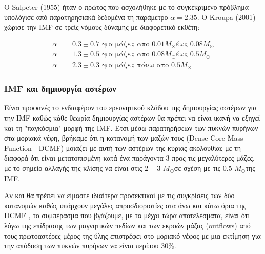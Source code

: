 \documentclass[a4paper,11pt]{memoir}
\newcommand{\sm}{$M_{\odot}$}
\begin{document}
Ο Salpeter (1955) ήταν ο πρώτος που ασχολήθηκε με το συγκεκριμένο πρόβλημα υπολόγισε από παρατηρησιακά δεδομένα τη παράμετρο $\alpha=2.35$.
Ο Kroupa (2001) χώρισε την IMF σε τρείς νόμους δύναμης με διαφορετικό εκθέτη:

\begin{align}
\alpha&=0.3 \pm 0.7 \text{ για μάζες απο $0.01$\sm έως $0.08$\sm} \\
\alpha&=1.3 \pm 0.5 \text{ για μάζες απο $0.08$\sm έως $0.5$\sm} \\
\alpha&=2.3 \pm 0.3 \text{ για μάζες πάνω απο $0.5$\sm}
\end{align}

\subsubsection{IMF και δημιουργία αστέρων}
Είναι προφανές το ενδιαφέρον του ερευνητικού κλάδου της δημιουργίας αστέρων για την IMF καθώς κάθε θεωρία δημιουργίας αστέρων θα πρέπει να είναι ικανή να εξηγεί και τη "παγκόσμια" μορφή της IMF.
Έτσι μέσω παρατηρήσεων των πυκνών πυρήνων στα μοριακά νέφη, βρήκαμε ότι η κατανομή των μαζών τους (Dense Core Mass Function - DCMF) μοιάζει με αυτή των αστέρων της κύριας ακολουθίας με τη διαφορά ότι είναι μετατοπισμένη κατά ένα παράγοντα $3$ προς τις μεγαλύτερες μάζες, με το σημείο αλλαγής της κλίσης να είναι στις $2-3$ \sm σε σχέση με τις $0.5$ \sm της IMF. 

Αν και θα πρέπει να είμαστε ιδιαίτερα προσεκτικοί με τις συγκρίσεις των δύο κατανομών καθώς υπάρχουν μεγάλες απροσδιοριστίες στα άνω και κάτω όρια της DCMF \cite{polychroni__2010}, το συμπέρασμα που βγάζουμε, με τα μέχρι τώρα αποτελέσματα, είναι ότι λόγω της επίδρασης των μαγνητικών πεδίων και των εκροών μάζας (outflows) από τους πρωτοαστέρες μέρος της ύλης επιστρέφει στο μοριακό νέφος με μια εκτίμηση για την απόδοση των πυκνών πυρήνων να είναι περίπου 30\%.
 



\end{document}
